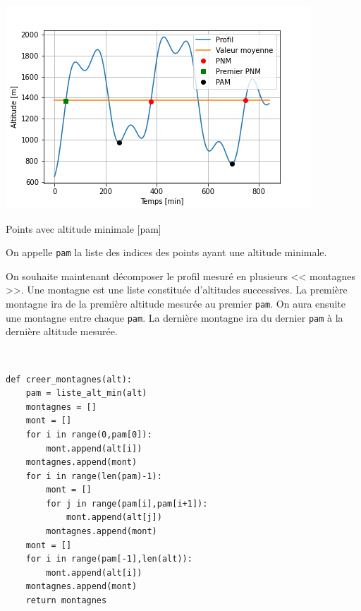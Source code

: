 \ifprof
\else

\begin{marginfigure}
\includegraphics[width=\linewidth]{fig_04}
\caption{Points avec altitude minimale [pam]}
\end{marginfigure}


On appelle \texttt{pam} la liste des indices des points ayant une altitude minimale.


On souhaite maintenant décomposer le profil mesuré en plusieurs << montagnes >>. 
Une montagne est une liste constituée d'altitudes successives.
La première montagne ira de la première altitude mesurée au premier \texttt{pam}. 
On aura ensuite une montagne entre chaque \texttt{pam}. 
La dernière montagne ira du dernier \texttt{pam} à la dernière altitude mesurée.
\fi


\ifprof
\begin{corrige}~\\
\vspace{-.5cm}
\begin{lstlisting}
def creer_montagnes(alt):
    pam = liste_alt_min(alt)
    montagnes = []
    mont = []
    for i in range(0,pam[0]):
        mont.append(alt[i])
    montagnes.append(mont)
    for i in range(len(pam)-1):
        mont = []
        for j in range(pam[i],pam[i+1]):
            mont.append(alt[j])
        montagnes.append(mont)
    mont = []
    for i in range(pam[-1],len(alt)):
        mont.append(alt[i])
    montagnes.append(mont)
    return montagnes
\end{lstlisting}
\end{corrige}
\else
\fi


